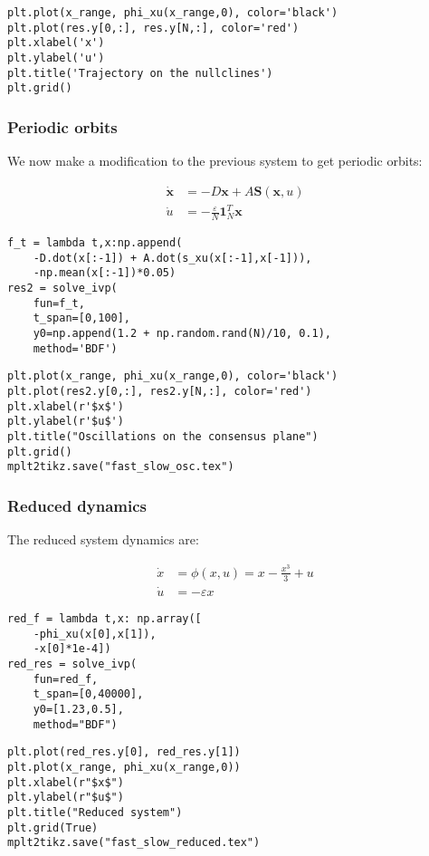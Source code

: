 \begin{verbatim}
plt.plot(x_range, phi_xu(x_range,0), color='black')
plt.plot(res.y[0,:], res.y[N,:], color='red')
plt.xlabel('x')
plt.ylabel('u')
plt.title('Trajectory on the nullclines')
plt.grid()
\end{verbatim}

\hypertarget{periodic-orbits}{%
\subsubsection{Periodic orbits}\label{periodic-orbits}}

We now make a modification to the previous system to get periodic
orbits:

\begin{equation}
\begin{aligned}
\dot{\mathbf{x}} &= -D\mathbf{x} + A\mathbf{S}(\mathbf{x}, u) \\
\dot{u} &= -\frac{\varepsilon}{N} \mathbf{1}_N^T\mathbf{x}
\end{aligned}
\end{equation}

\begin{verbatim}
f_t = lambda t,x:np.append(
    -D.dot(x[:-1]) + A.dot(s_xu(x[:-1],x[-1])),
    -np.mean(x[:-1])*0.05)
res2 = solve_ivp(
    fun=f_t,
    t_span=[0,100],
    y0=np.append(1.2 + np.random.rand(N)/10, 0.1),
    method='BDF')
\end{verbatim}

\begin{verbatim}
plt.plot(x_range, phi_xu(x_range,0), color='black')
plt.plot(res2.y[0,:], res2.y[N,:], color='red')
plt.xlabel(r'$x$')
plt.ylabel(r'$u$')
plt.title("Oscillations on the consensus plane")
plt.grid()
mplt2tikz.save("fast_slow_osc.tex")
\end{verbatim}

\hypertarget{reduced-dynamics}{%
\subsubsection{Reduced dynamics}\label{reduced-dynamics}}

The reduced system dynamics are:

\begin{equation}
\begin{aligned}
\dot{x} &= \phi(x,u) = x - \frac{x^3}{3} + u\\
\dot{u} &= -\varepsilon x
\end{aligned}
\end{equation}

\begin{verbatim}
red_f = lambda t,x: np.array([
    -phi_xu(x[0],x[1]),
    -x[0]*1e-4])
red_res = solve_ivp(
    fun=red_f,
    t_span=[0,40000],
    y0=[1.23,0.5],
    method="BDF")
\end{verbatim}

\begin{verbatim}
plt.plot(red_res.y[0], red_res.y[1])
plt.plot(x_range, phi_xu(x_range,0))
plt.xlabel(r"$x$")
plt.ylabel(r"$u$")
plt.title("Reduced system")
plt.grid(True)
mplt2tikz.save("fast_slow_reduced.tex")
\end{verbatim}

